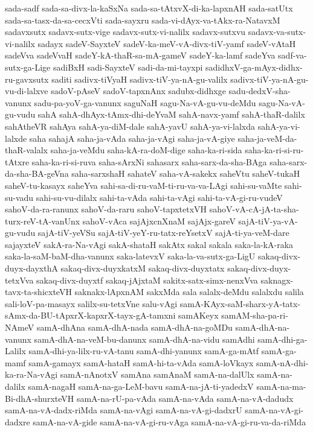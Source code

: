 {sada-sadf
sada-sa-divx-la-kaSxNa
sada-sa-tAtxvX-di-ka-lapxnAH
sada-satUtx
sada-sa-tasx-da-sa-cecxVti
sada-sayxru
sada-vi-dAyx-va-tAkx-ra-NatavxM
sadavxsutx
sadavx-sutx-vige
sadavx-sutx-vi-nalilx
sadavx-sutxvu
sadavx-va-sutx-vi-nalilx
sadayx
sadeV-SayxteV
sadeV-ka-meV-vA-divx-tiV-yamf
sadeV-vAtaH
sadeVva
sadeVvaH
sadeY-kA-thaR-sa-mA-gameV
sadeY-ka-lamf
sadeYva
sadf-va-sutx-ga-Lige
sadiBxH
sadi-SayxteV
sadi-da-mi-tayxpi
sadidhxV-ga-mAyx-didhx-ru-gavxsutx
saditi
sadivx-tiVyaH
sadivx-tiV-ya-nA-gu-valilx
sadivx-tiV-ya-nA-gu-vu-di-lalxve
sadoV-pAseV
sadoV-tapxnAnx
sadubx-didhxge
sadu-dedxV-sha-vanunx
sadu-pa-yoV-ga-vanunx
saguNaH
sagu-Na-vA-gu-vu-deMdu
sagu-Na-vA-gu-vudu
sahA
sahA-dhAyx-tAmx-dhi-deYvaM
sahA-navx-yamf
sahA-thaR-dalilx
sahAtheVR
sahAya
sahA-ya-diM-dale
sahA-yavU
sahA-ya-vi-lalxda
sahA-ya-vi-lalxde
saha
sahajA
saha-ja-vAda
saha-ja-vAgi
saha-ja-vA-giye
saha-ja-veM-da-thaR-valalx
saha-ja-veMdu
saha-kA-ra-doM-dige
saha-ka-ri-sida
saha-ka-ri-si-ru-tAtxre
saha-ka-ri-si-ruva
saha-sArxNi
sahasarx
saha-sarx-da-sha-BAga
saha-sarx-da-sha-BA-geVna
saha-sarxshaH
sahateV
saha-vA-sakekx
saheVtu
saheV-tukaH
saheV-tu-kasayx
saheYva
sahi-sa-di-ru-vaM-ti-ru-va-va-LAgi
sahi-su-vaMte
sahi-su-vadu
sahi-su-vu-dilalx
sahi-ta-vAda
sahi-ta-vAgi
sahi-ta-vA-gi-ru-vudeV
sahoV-da-ra-ranunx
sahoV-da-raru
sahoV-tapxtetxVH
sahoV-vA-cA-jA-ta-sha-turx-reV-tA-vanUnx
sahoV-vAca
sajAjxcnXnaM
sajAjx-gareV
sajA-tiV-ya-vA-gu-vudu
sajA-tiV-yeVSu
sajA-tiV-yeY-ru-tatx-reYsetxV
sajA-ti-ya-veM-dare
sajayxteV
sakA-ra-Na-vAgi
sakA-shataH
sakAtx
sakal
sakala
saka-la-kA-raka
saka-la-saM-baM-dha-vanunx
saka-latevxV
saka-la-va-sutx-ga-LigU
sakaq-divx-duyx-dayxthA
sakaq-divx-duyxkatxM
sakaq-divx-duyxtatx
sakaq-divx-duyx-tetxVva
sakaq-divx-duyxtf
sakaq-jAjxtaM
sakitx-satx-simx-nenxVva
saknagx-tavx-ta-shicxteVH
saknakx-lApxnAM
sakxMda
sala
salalx-deMdu
salalxdu
salila
sali-loV-pa-masayx
salilx-su-tetxVne
salu-vAgi
samA-KAyx-saM-sharx-yA-tatx-sAmx-da-BU-tApxrX-kapxrX-tayx-gA-tamxni
samAKeyx
samAM-sha-pa-ri-NAmeV
samA-dhAna
samA-dhA-nada
samA-dhA-na-goMDu
samA-dhA-na-vanunx
samA-dhA-na-veM-bu-danunx
samA-dhA-na-vidu
samAdhi
samA-dhi-ga-Lalilx
samA-dhi-ya-lilx-ru-vA-tanu
samA-dhi-yanunx
samA-ga-mAtf
samA-ga-mamf
samA-gamayx
samA-hataH
samA-hi-ta-vAda
samA-loVkayx
samA-nA-dhi-ka-ra-Na-vAgi
samA-nAnotxV
samAna
samAnaM
samA-na-dalUlx
samA-na-dalilx
samA-nagaH
samA-na-ga-LeM-bavu
samA-na-jA-ti-yadedxV
samA-na-ma-Bi-dhA-shurxteVH
samA-na-rU-pa-vAda
samA-na-vAda
samA-na-vA-dadudx
samA-na-vA-dadx-riMda
samA-na-vAgi
samA-na-vA-gi-dadxrU
samA-na-vA-gi-dadxre
samA-na-vA-gide
samA-na-vA-gi-ru-vAga
samA-na-vA-gi-ru-va-da-riMda
}
